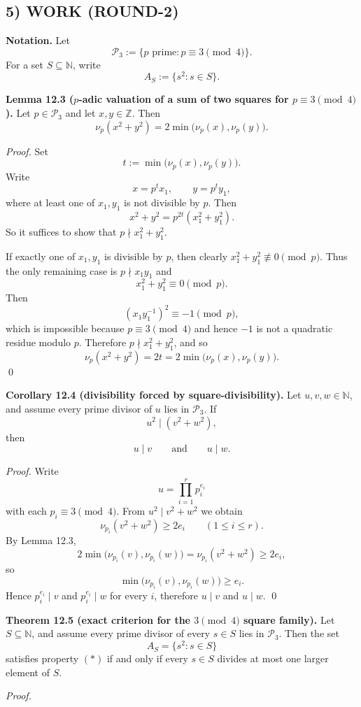 \subsection*{5) WORK (ROUND-2)}

\textbf{Notation.}
Let
\[
\mathcal P_3:=\{p\text{ prime}: p\equiv 3\pmod 4\}.
\]
For a set $S\subseteq\mathbb N$, write
\[
A_S:=\{s^2:s\in S\}.
\]

\medskip
\noindent\textbf{Lemma 12.3 ($p$-adic valuation of a sum of two squares for $p\equiv 3\pmod 4$).}
Let $p\in\mathcal P_3$ and let $x,y\in\mathbb Z$. Then
\[
\nu_p(x^2+y^2)=2\min\bigl(\nu_p(x),\nu_p(y)\bigr).
\]

\emph{Proof.}
Set
\[
t:=\min\bigl(\nu_p(x),\nu_p(y)\bigr).
\]
Write
\[
x=p^t x_1,\qquad y=p^t y_1,
\]
where at least one of $x_1,y_1$ is not divisible by $p$.
Then
\[
x^2+y^2=p^{2t}(x_1^2+y_1^2).
\]
So it suffices to show that $p\nmid x_1^2+y_1^2$.

If exactly one of $x_1,y_1$ is divisible by $p$, then clearly $x_1^2+y_1^2\not\equiv 0\pmod p$.
Thus the only remaining case is $p\nmid x_1y_1$ and
\[
x_1^2+y_1^2\equiv 0\pmod p.
\]
Then
\[
(x_1y_1^{-1})^2\equiv -1\pmod p,
\]
which is impossible because $p\equiv 3\pmod 4$ and hence $-1$ is not a quadratic residue modulo $p$.
Therefore $p\nmid x_1^2+y_1^2$, and so
\[
\nu_p(x^2+y^2)=2t=2\min\bigl(\nu_p(x),\nu_p(y)\bigr).
\]
\qed

\medskip
\noindent\textbf{Corollary 12.4 (divisibility forced by square-divisibility).}
Let $u,v,w\in\mathbb N$, and assume every prime divisor of $u$ lies in $\mathcal P_3$.
If
\[
u^2\mid (v^2+w^2),
\]
then
\[
u\mid v\qquad\text{and}\qquad u\mid w.
\]

\emph{Proof.}
Write
\[
u=\prod_{i=1}^r p_i^{e_i}
\]
with each $p_i\equiv 3\pmod 4$.
From $u^2\mid v^2+w^2$ we obtain
\[
\nu_{p_i}(v^2+w^2)\ge 2e_i
\qquad (1\le i\le r).
\]
By Lemma 12.3,
\[
2\min\bigl(\nu_{p_i}(v),\nu_{p_i}(w)\bigr)=\nu_{p_i}(v^2+w^2)\ge 2e_i,
\]
so
\[
\min\bigl(\nu_{p_i}(v),\nu_{p_i}(w)\bigr)\ge e_i.
\]
Hence $p_i^{e_i}\mid v$ and $p_i^{e_i}\mid w$ for every $i$, therefore $u\mid v$ and $u\mid w$.
\qed

\medskip
\noindent\textbf{Theorem 12.5 (exact criterion for the $3\pmod 4$ square family).}
Let $S\subseteq\mathbb N$, and assume every prime divisor of every $s\in S$ lies in $\mathcal P_3$.
Then the set
\[
A_S=\{s^2:s\in S\}
\]
satisfies property $(*)$ if and only if every $s\in S$ divides at most one larger element of $S$.

\emph{Proof.}

